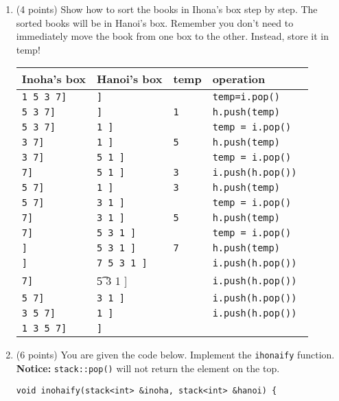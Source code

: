 \documentclass[11pt]{article}
\begin{document}
\begin{enumerate}
\begin{enumerate}
\item (4 points) Show how to sort the books in Ihona's box step by step. The sorted books will be in Hanoi's box. Remember you don't need to immediately move the book from one box to the other. Instead, store it in temp!

\begin{tabular}{l|l|l|l}
Inoha's box      & Hanoi's box & temp   &   operation\\\hline
{\tt 1 5 3 7]} & {\tt ]}     &   {\tt }     &   {\tt temp=i.pop()}\\\hline
{\tt 5 3 7]} &  {\tt ]} & {\tt 1 } & {\tt h.push(temp)}\\\hline
{\tt 5 3 7]} &  {\tt1 ]} & {\tt } & {\tt temp = i.pop()}\\\hline
{\tt 3 7]} &  {\tt1 ]} & {\tt 5} & {\tt h.push(temp)}\\\hline
{\tt 3 7]} &  {\tt5 1 ]} & {\tt } & {\tt temp = i.pop()}\\\hline
{\tt 7]} &  {\tt5 1 ]} & {\tt3 } & {\tt i.push(h.pop()) }\\\hline
{\tt 5 7]} &  {\tt1 ]} & {\tt3 } & {\tt h.push(temp)}\\\hline
{\tt 5 7]} &  {\tt3 1 ]} & {\tt } & {\tt temp = i.pop()}\\\hline
{\tt 7]} &  {\tt3 1 ]} & {\tt 5} & {\tt h.push(temp)}\\\hline
{\tt 7]} &  {\tt5 3 1 ]} & {\tt } & {\tt temp = i.pop()}\\\hline
{\tt ]} &  {\tt5 3 1 ]} & {\tt 7} & {\tt h.push(temp)}\\\hline
{\tt ]} &  {\tt7 5 3 1 ]} & {\tt } & {\tt i.push(h.pop())}\\\hline
{\tt 7]} &  {\t 5 3 1 ]} & {\tt } & {\tt i.push(h.pop())}\\\hline
{\tt 5 7]} &  {\tt3 1 ]} & {\tt } & {\tt i.push(h.pop())}\\\hline
{\tt 3 5 7]} &  {\tt 1 ]} & {\tt } & {\tt i.push(h.pop())}\\\hline
{\tt 1 3 5 7]} &  {\tt]} & {\tt } & {\tt }\\\hline
\end{tabular}
\newpage
\item (6 points) You are given the code below. Implement the {\tt ihonaify} function. {\bf Notice:} {\tt stack::pop()} will not return the element on the top.

\begin{lstlisting}
void inohaify(stack<int> &inoha, stack<int> &hanoi) {
	 

\end{lstlisting}
\end{enumerate}
\end{enumerate}
\end{document}
